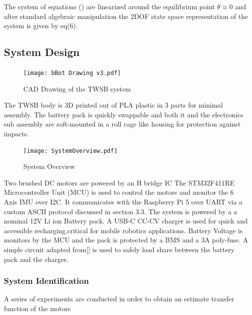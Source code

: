     The system of equations () are linearized around the equilibrium point $\theta\approx 0$  and after standard algebraic manipulation the 
    2DOF state space representation of the system is given by eq(6).


   
    \pagebreak{}

    \subsection{System Design}
        \begin{figure}[H]
            \texttt{[image: bBot Drawing v3.pdf]}
            \caption{CAD Drawing of the TWSB system}
        \end{figure}

        The TWSB body is 3D printed out of PLA plastic in 3 parts for minimal assembly.
        The battery pack is quickly swappable and both it and the electronics sub assembly 
        are soft-mounted in a roll cage like housing for protection against impacts. 
        \begin{figure}[H]
            \centering
            \texttt{[image: SystemOverview.pdf]}
            \caption{System Overview}
        \end{figure}

        Two brushed DC motors are powered by an H bridge IC 
        The STM32F411RE Microcontroller Unit (MCU) is used to control the 
        motors and monitor the 6 Axis IMU over I2C. It communicates with the 
        Raspberry Pi 5 over UART via a custom ASCII protocol discussed in section 3.3. 
        The system is powered by a a nominal 12V Li ion Battery pack. A USB-C CC-CV charger is used for quick 
        and accessible recharging,critical for mobile robotics applications. Battery Voltage is monitors by the MCU
        and the pack is protected by a BMS and a 3A poly-fuse.
        A simple circuit adapted from[] is used to safely load share between the battery pack and the charger.


        \pagebreak{}
        \subsubsection{System Identification}


        A series of experiments are conducted in order to obtain an estimate transfer function of the motors
        

